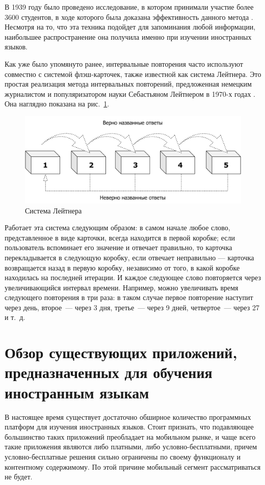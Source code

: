 В 1939 году было проведено исследование, в котором принимали участие более 3600 студентов, в ходе которого была доказана эффективность данного метода \cite{spitzer}. Несмотря на то, что эта техника подойдет для запоминания любой информации, наибольшее распространение она получила именно при изучении иностранных языков.

Как уже было упомянуто ранее, интервальные повторения часто используют совместно с системой флэш-карточек, также известной как система Лейтнера. Это простая реализация метода интервальных повторений, предложенная немецким журналистом и популяризатором науки Себастьяном Лейтнером в 1970-х годах \cite{leitner}. Она наглядно показана на рис.~\ref{fig:leitner}.

\begin{figure}
	\centering
	\includegraphics[keepaspectratio, scale=0.8]{figures/leitner}
	\caption{Система Лейтнера}
	\label{fig:leitner}
\end{figure}

Работает эта система следующим образом: в самом начале любое слово, представленное в виде карточки, всегда находится в первой коробке; если пользователь вспоминает его значение и отвечает правильно, то карточка перекладывается в следующую коробку, если отвечает неправильно — карточка возвращается назад в первую коробку, независимо от того, в какой коробке находилась на последней итерации. И каждое следующее слово повторяется через увеличивающийся интервал времени. Например, можно увеличивать время следующего повторения в три раза: в таком случае первое повторение наступит через день, второе~--- через 3 дня, третье~--- через 9 дней, четвертое~--- через 27 и т.~д.

\section{Обзор существующих приложений, предназначенных для обучения иностранным языкам}

В настоящее время существует достаточно обширное количество программных платформ для изучения иностранных языков. Стоит признать, что подавляющее большинство таких приложений преобладает на мобильном рынке, и чаще всего такие приложения являются либо платными, либо условно-бесплатными, причем условно-бесплатные решения сильно ограничены по своему функционалу и контентному содержимому. По этой причине мобильный сегмент рассматриваться не будет.

